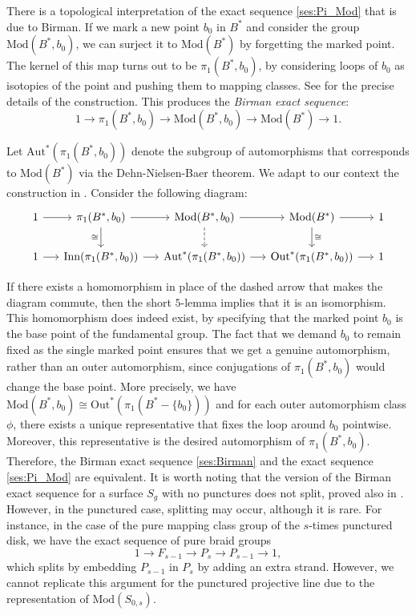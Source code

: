 \documentclass[10pt]{amsart}
\theoremstyle{definition}
\begin{document}
 There is a topological interpretation of the exact sequence \ref{ses:Pi_Mod} that is due to Birman. If we mark a new point $b_0$ in $B^*$ and consider the group $\mathrm{Mod}(B^*,b_0)$, we can surject it to $\mathrm{Mod}(B^*)$ by forgetting the marked point. The kernel of this map turns out to be $\pi_1(B^*,b_0)$, by considering loops of $b_0$ as isotopies of the point and pushing them to mapping classes. 
 See \cite[Ch. 4.2.1]{FarbMagalit} for the precise details of the construction. This produces the {\em Birman exact sequence}:
 \begin{equation}\label{ses:Birman}
     1\rightarrow \pi_1(B^*,b_0) \rightarrow \mathrm{Mod}(B^*,b_0) \rightarrow \mathrm{Mod}(B^*)\rightarrow 1.
 \end{equation}
 
Let $\mathrm{Aut}^*(\pi_1(B^*,b_0))$ denote the subgroup of automorphisms that corresponds to $\mathrm{Mod}(B^*)$ via the Dehn-Nielsen-Baer theorem. We adapt to our context the construction in \cite[Pg. 235]{FarbMagalit}. Consider the following diagram:
\begin{equation*}
\begin{tikzcd}[column sep=1.4em]
1 \arrow[r] & {\pi_1(B^*,b_0)} \arrow[d, "\cong"'] \arrow[r] & {\mathrm{Mod}(B^*,b_0)} \arrow[d, dashed] \arrow[r] & \mathrm{Mod}(B^*) \arrow[d, "\cong"] \arrow[r] & 1 \\
1 \arrow[r] & {\mathrm{Inn}(\pi_1(B^*,b_0))} \arrow[r]       & {\mathrm{Aut}^*(\pi_1(B^*,b_0))} \arrow[r]          & {\mathrm{Out}^*(\pi_1(B^*,b_0))} \arrow[r]     & 1
\end{tikzcd}
\end{equation*}

If there exists a homomorphism in place of the dashed arrow that makes the diagram commute, then the short $5$-lemma implies that it is an isomorphism. This homomorphism does indeed exist, by specifying that the marked point $b_0$ is the base point of the fundamental group. The fact that we demand $b_0$ to remain fixed as the single marked point ensures that we get a genuine automorphism, rather than an outer automorphism, since conjugations of $\pi_1(B^*,b_0)$ would change the base point. 
More precisely, we have $\mathrm{Mod}(B^*,b_0) \cong \mathrm{Out}^*(\pi_1(B^*-\{b_0\}))$ and for each outer automorphism class $\phi$, there exists a unique representative that fixes the loop around $b_0$ pointwise. 
Moreover, this representative is the desired automorphism of $\pi_1(B^*,b_0)$. 
Therefore, the Birman exact sequence \ref{ses:Birman} and the exact sequence \ref{ses:Pi_Mod} are equivalent.
It is worth noting that the version of the Birman exact sequence for a surface $S_g$ with no punctures does not split, proved also in \cite{FarbMagalit}. 
However, in the punctured case, splitting may occur, although it is rare. 
For instance, in the case of the pure mapping class group of the $s$-times punctured disk, we have the exact sequence of pure braid groups
\[1\rightarrow F_{s-1} \rightarrow P_s \rightarrow P_{s-1} \rightarrow 1,\] 
which splits by embedding $P_{s-1}$ in $P_s$ by adding an extra strand.
However, we cannot replicate this argument for the punctured projective line due to the representation of $\mathrm{Mod}(S_{0,s})$.
\end{document}
